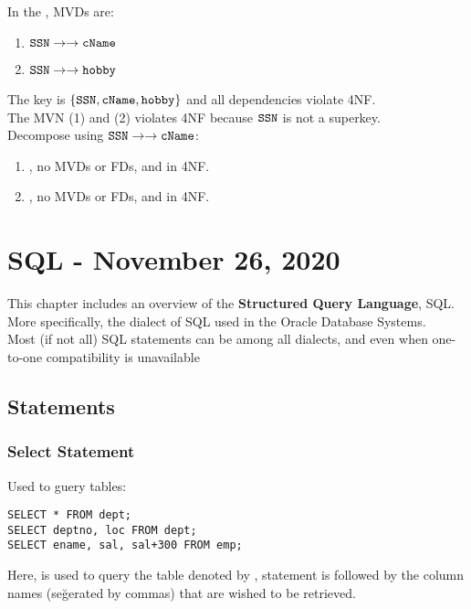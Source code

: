 \documentclass[11pt,a4paper,twocolumn]{book}
\begin{document}
\newcommand{\mvd}{\mvn}

In the \ApplyExample, MVDs are:

\begin{enumerate}
\item $\C{SSN} \mvd \C{cName} $
\item $\C{SSN} \mvd \C{hobby}$
\end{enumerate}

The key is $\{ \texttt{SSN}, \texttt{cName}, \texttt{hobby} \}$ and all dependencies violate 4NF.\\

The MVN (1) and (2) violates 4NF because $\texttt{SSN}$ is not a superkey.\\

Decompose using $\C{SSN} \mvd \C{cName}$:

\begin{enumerate}
\item {}, no MVDs or FDs, and in 4NF.
\item {}, no MVDs or FDs, and in 4NF.
\end{enumerate}

\chapter{SQL - November 26, 2020}

This chapter includes an overview of the \textbf{Structured Query Language}, SQL. More specifically, the dialect of SQL used in the Oracle Database Systems.\\

Most (if not all) SQL statements can be among all dialects, and even when one-to-one compatibility is unavailable

\section{Statements}
\subsection{Select Statement}
Used to guery tables:
\begin{lstlisting}
SELECT * FROM dept;
SELECT deptno, loc FROM dept;
SELECT ename, sal, sal+300 FROM emp;
\end{lstlisting}

Here,  is used to query the table denoted by ,  statement is followed by the column names (seğerated by commas) that are wished to be retrieved.\\
\end{document}
